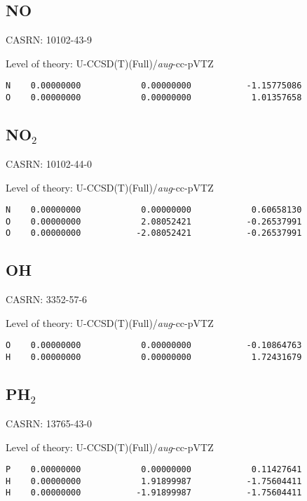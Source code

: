 \documentclass[journal=jctcce,manuscript=article,layout=traditional]{achemso}
\newcommand{\AVTZ}{\emph{aug}-cc-pVTZ}
\begin{document}
\subsection{NO}

CASRN: 10102-43-9

\begin{singlespace}
\noindent Level of theory: U-CCSD(T)(Full)/{\AVTZ}
\begin{verbatim}
N    0.00000000            0.00000000           -1.15775086
O    0.00000000            0.00000000            1.01357658
\end{verbatim}
\end{singlespace}

\subsection{NO$_2$}

CASRN: 10102-44-0

\begin{singlespace}
\noindent Level of theory: U-CCSD(T)(Full)/{\AVTZ}
\begin{verbatim}
N    0.00000000            0.00000000            0.60658130 
O    0.00000000            2.08052421           -0.26537991
O    0.00000000           -2.08052421           -0.26537991
\end{verbatim}
\end{singlespace}

\subsection{OH}

CASRN: 3352-57-6

\begin{singlespace}
\noindent Level of theory: U-CCSD(T)(Full)/{\AVTZ}
\begin{verbatim}
O    0.00000000            0.00000000           -0.10864763
H    0.00000000            0.00000000            1.72431679
\end{verbatim}
\end{singlespace}

\subsection{PH$_2$}

CASRN: 13765-43-0

\begin{singlespace}
\noindent Level of theory: U-CCSD(T)(Full)/{\AVTZ}
\begin{verbatim}
P    0.00000000            0.00000000            0.11427641
H    0.00000000            1.91899987           -1.75604411
H    0.00000000           -1.91899987           -1.75604411
\end{verbatim}
\end{singlespace}
\end{document}

